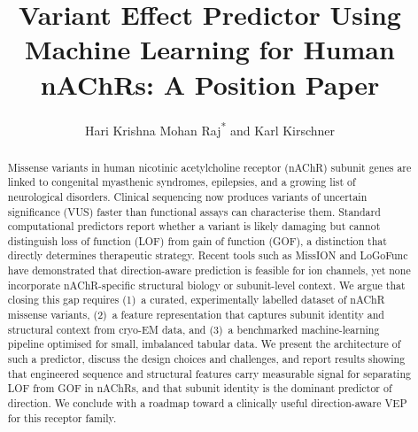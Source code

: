 \documentclass{ws-procs11x85}
\begin{document}
\title{Variant Effect Predictor Using Machine Learning for Human\\
nAChRs: A Position Paper}

\author{Hari Krishna Mohan Raj\textsuperscript{*} and Karl Kirschner}

\address{Department of Computational Chemistry,\\
Hochschule Bonn--Rhein--Sieg, Sankt Augustin, Germany\\
\textsuperscript{*}E-mail: harikrishnam0711@gmail.com}

\begin{abstract}
Missense variants in human nicotinic acetylcholine receptor (nAChR)
subunit genes are linked to congenital myasthenic syndromes, epilepsies,
and a growing list of neurological disorders. Clinical sequencing now
produces variants of uncertain significance (VUS) faster than functional
assays can characterise them. Standard computational predictors report
whether a variant is likely damaging but cannot distinguish loss of
function (LOF) from gain of function (GOF), a distinction that directly
determines therapeutic strategy. Recent tools such as MissION and
LoGoFunc have demonstrated that direction-aware prediction is feasible
for ion channels, yet none incorporate nAChR-specific structural biology
or subunit-level context. We argue that closing this gap requires (1)~a
curated, experimentally labelled dataset of nAChR missense variants,
(2)~a feature representation that captures subunit identity and
structural context from cryo-EM data, and (3)~a benchmarked machine-learning
pipeline optimised for small, imbalanced tabular data. We present the
architecture of such a predictor, discuss the design choices and
challenges, and report results showing that engineered sequence and
structural features carry measurable signal for separating LOF from GOF
in nAChRs, and that subunit identity is the dominant predictor of
direction. We conclude with a roadmap toward a clinically useful
direction-aware VEP for this receptor family.
\end{abstract}


\end{document}
